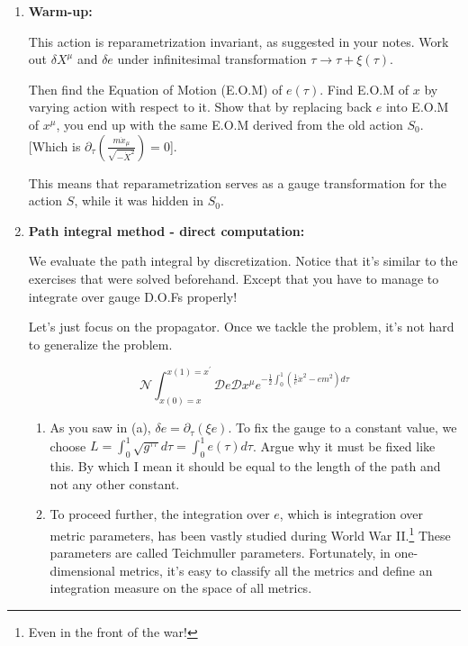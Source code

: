 \documentclass[11pt]{article}
\begin{document}
	\begin{enumerate}
	\item
	\begin{problem}{\points{-}}
		\textbf{Warm-up:} 
		
		\noindent
		This action is reparametrization invariant, as suggested in your notes. Work out $\delta X^\mu$ and $\delta e$ under infinitesimal transformation $\tau \xrightarrow{} \tau + \xi(\tau)$.
		
		\noindent
		Then find the Equation of Motion (E.O.M) of $e(\tau)$. Find E.O.M of $x$ by varying action with respect to it. Show that by replacing back $e$ into E.O.M of $x^\mu$, you end up with the same E.O.M derived from the old action $S_0$.[Which is $\partial_\tau (\frac{m\dot{x}_\mu}{\sqrt{-\dot{X}^2}})=0$].
		
		\noindent This means that reparametrization serves as a gauge transformation for the action $S$, while it was hidden in $S_0$.
		
		
	\end{problem}
	\item
	\begin{problem}{\points{-}}
		\textbf{Path integral method - direct computation:}
		
		We evaluate the path integral by discretization. Notice that it's similar to the exercises that were solved beforehand. Except that you have to manage to integrate over gauge D.O.Fs properly!
		
		\noindent
		 Let's just focus on the propagator. Once we tackle the problem, it's not hard to generalize the problem.
		 
		 \[
		 \mathcal{N} \int_{x(0) = x}^{x(1) = x^{\prime}} \mathcal{D}e \mathcal{D}x^\mu e^{-\frac12 \int_0^1 (\frac1{e}\dot{x}^2 - em^2) d\tau}
		 \]
		 
		\noindent
		\begin{enumerate}
			\item 
			As you saw in (a), $\delta e = \partial_\tau (\xi e)$. To fix the gauge to a constant value, we choose $L = \int_0^1 \sqrt{g^{\tau\tau}}d\tau = \int_0^1 e(\tau) d\tau$. Argue why it must be fixed like this. By which I mean it should be equal to the length of the path and not any other constant.			
			\item  To proceed further, the integration over $e$, which is integration over metric parameters, has been vastly studied during World War II.\footnote{Even in the front of the war!} These parameters are called Teichmuller parameters. Fortunately, in one-dimensional metrics, it's easy to classify all the metrics and define an integration measure on the space of all metrics.
			

\end{enumerate}
\end{problem}
\end{enumerate}
\end{document}

